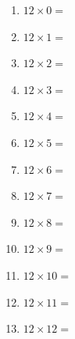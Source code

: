 \documentclass{article}
\begin{document}
\begin{multicols}{4}
\begin{enumerate}
\item $12 \times 0 =$
\item $12 \times 1 =$
\item $12 \times 2 =$
\item $12 \times 3 =$
\item $12 \times 4 =$
\item $12 \times 5 =$
\item $12 \times 6 =$
\item $12 \times 7 =$
\item $12 \times 8 =$
\item $12 \times 9 =$
\item $12 \times 10 =$
\item $12 \times 11 =$
\item $12 \times 12 =$

\end{enumerate}
\end{multicols}
\end{document}
